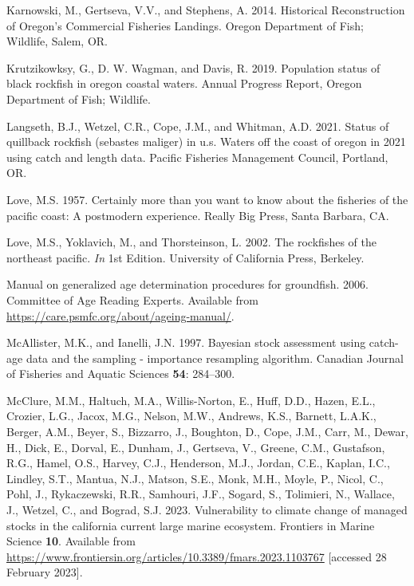 \documentclass[11pt,
  english,
  letterpaper,
]{article}
\newlength{\cslhangindent}
\newenvironment{CSLReferences}[2] %
 {%
  \setlength{\parindent}{0pt}
  \ifodd #1 \everypar{\setlength{\hangindent}{\cslhangindent}}\ignorespaces\fi
  \ifnum #2 > 0
  \setlength{\parskip}{#2\baselineskip}
  \fi
 }%
 {}
\begin{document}
\begin{CSLReferences}{1}{0}
\leavevmode{}%
Karnowski, M., Gertseva, V.V., and Stephens, A. 2014. Historical {Reconstruction} of {Oregon}'s {Commercial} {Fisheries} {Landings}. Oregon Department of Fish; Wildlife, Salem, OR.

\leavevmode{}%
Krutzikowksy, G., D. W. Wagman, and Davis, R. 2019. Population status of black rockfish in oregon coastal waters. Annual Progress Report, Oregon Department of Fish; Wildlife.

\leavevmode{}%
Langseth, B.J., Wetzel, C.R., Cope, J.M., and Whitman, A.D. 2021. Status of quillback rockfish (sebastes maliger) in u.s. Waters off the coast of oregon in 2021 using catch and length data. Pacific Fisheries Management Council, Portland, {OR}.

\leavevmode{}%
Love, M.S. 1957. Certainly more than you want to know about the fisheries of the pacific coast: A postmodern experience. Really Big Press, Santa Barbara, CA.

\leavevmode{}%
Love, M.S., Yoklavich, M., and Thorsteinson, L. 2002. The rockfishes of the northeast pacific. \emph{In} 1st Edition. University of California Press, Berkeley.

\leavevmode{}%
Manual on generalized age determination procedures for groundfish. 2006. Committee of Age Reading Experts. Available from \url{https://care.psmfc.org/about/ageing-manual/}.

\leavevmode{}%
McAllister, M.K., and Ianelli, J.N. 1997. Bayesian stock assessment using catch-age data and the sampling - importance resampling algorithm. Canadian Journal of Fisheries and Aquatic Sciences \textbf{54}: 284--300.

\leavevmode{}%
McClure, M.M., Haltuch, M.A., Willis-Norton, E., Huff, D.D., Hazen, E.L., Crozier, L.G., Jacox, M.G., Nelson, M.W., Andrews, K.S., Barnett, L.A.K., Berger, A.M., Beyer, S., Bizzarro, J., Boughton, D., Cope, J.M., Carr, M., Dewar, H., Dick, E., Dorval, E., Dunham, J., Gertseva, V., Greene, C.M., Gustafson, R.G., Hamel, O.S., Harvey, C.J., Henderson, M.J., Jordan, C.E., Kaplan, I.C., Lindley, S.T., Mantua, N.J., Matson, S.E., Monk, M.H., Moyle, P., Nicol, C., Pohl, J., Rykaczewski, R.R., Samhouri, J.F., Sogard, S., Tolimieri, N., Wallace, J., Wetzel, C., and Bograd, S.J. 2023. Vulnerability to climate change of managed stocks in the california current large marine ecosystem. Frontiers in Marine Science \textbf{10}. Available from \url{https://www.frontiersin.org/articles/10.3389/fmars.2023.1103767} {[}accessed 28 February 2023{]}.


\end{CSLReferences}
\end{document}
